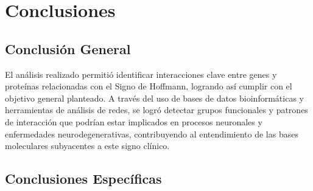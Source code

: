 \section{Conclusiones}

\subsection{Conclusión General}

El análisis realizado permitió identificar interacciones clave entre genes y proteínas relacionadas con el Signo de Hoffmann, logrando así cumplir con el objetivo general planteado. A través del uso de bases de datos bioinformáticas y herramientas de análisis de redes, se logró detectar grupos funcionales y patrones de interacción que podrían estar implicados en procesos neuronales y enfermedades neurodegenerativas, contribuyendo al entendimiento de las bases moleculares subyacentes a este signo clínico.

\subsection{Conclusiones Específicas}

